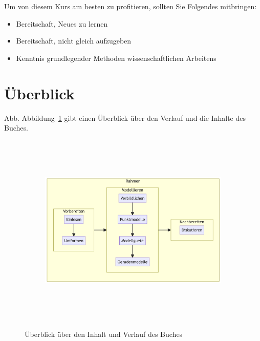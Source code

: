 \documentclass[
  a4paper,
  DIV=11]{scrreprt}
\providecommand{\tightlist}{%
  \setlength{\itemsep}{0pt}\setlength{\parskip}{0pt}}\usepackage{longtable,booktabs,array}
\theoremstyle{definition}
\theoremstyle{definition}
\theoremstyle{remark}
\begin{document}

Um von diesem Kurs am besten zu profitieren, sollten Sie Folgendes
mitbringen:

\begin{itemize}
\tightlist
\item
  Bereitschaft, Neues zu lernen
\item
  Bereitschaft, nicht gleich aufzugeben
\item
  Kenntnis grundlegender Methoden wissenschaftlichen Arbeitens
\end{itemize}

\hypertarget{uxfcberblick}{%
\section*{Überblick}\label{uxfcberblick}}


Abb. Abbildung~\ref{fig-ueberblick} gibt einen Überblick über den
Verlauf und die Inhalte des Buches.

\begin{figure}

{\centering 

\begin{figure}[H]

{\centering \includegraphics[width=7.93in,height=3.65in]{./index_files/figure-latex/mermaid-figure-1.png}

}

\end{figure}

}

\caption{\label{fig-ueberblick}Überblick über den Inhalt und Verlauf des
Buches}

\end{figure}
\end{document}
